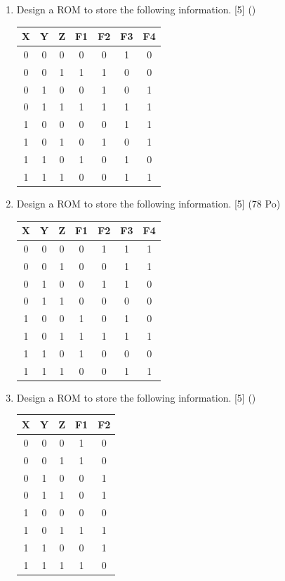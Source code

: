 \documentclass[12pt]{article}
\begin{document}
\begin{enumerate}
      \item Design a ROM to store the following information. \hfill [5] ()\\
      \begin{tabular}{|c|c|c||c|c|c|c|}
        \hline
        X & Y & Z & F1 & F2 & F3 & F4 \\ \hline
        0 & 0 & 0 & 0 & 0 & 1 & 0 \\ \hline
        0 & 0 & 1 & 1 & 1 & 0 & 0 \\ \hline
        0 & 1 & 0 & 0 & 1 & 0 & 1 \\ \hline
        0 & 1 & 1 & 1 & 1 & 1 & 1 \\ \hline
        1 & 0 & 0 & 0 & 0 & 1 & 1 \\ \hline
        1 & 0 & 1 & 0 & 1 & 0 & 1 \\ \hline
        1 & 1 & 0 & 1 & 0 & 1 & 0 \\ \hline
        1 & 1 & 1 & 0 & 0 & 1 & 1 \\ \hline
      \end{tabular}

      \item Design a ROM to store the following information. \hfill [5] (78 Po)\\
      \begin{tabular}{|c|c|c||c|c|c|c|}
        \hline
        X & Y & Z & F1 & F2 & F3 & F4 \\ \hline
        0 & 0 & 0 & 0 & 1 & 1 & 1 \\ \hline
        0 & 0 & 1 & 0 & 0 & 1 & 1 \\ \hline
        0 & 1 & 0 & 0 & 1 & 1 & 0 \\ \hline
        0 & 1 & 1 & 0 & 0 & 0 & 0 \\ \hline
        1 & 0 & 0 & 1 & 0 & 1 & 0 \\ \hline
        1 & 0 & 1 & 1 & 1 & 1 & 1 \\ \hline
        1 & 1 & 0 & 1 & 0 & 0 & 0 \\ \hline
        1 & 1 & 1 & 0 & 0 & 1 & 1 \\ \hline
      \end{tabular}

      \item Design a ROM to store the following information. \hfill [5] ()\\
      \begin{tabular}{|c|c|c||c|c|}
        \hline
        X & Y & Z & F1 & F2 \\ \hline
        0 & 0 & 0 & 1 & 0 \\ \hline
        0 & 0 & 1 & 1 & 0 \\ \hline
        0 & 1 & 0 & 0 & 1 \\ \hline
        0 & 1 & 1 & 0 & 1 \\ \hline
        1 & 0 & 0 & 0 & 0 \\ \hline
        1 & 0 & 1 & 1 & 1 \\ \hline
        1 & 1 & 0 & 0 & 1 \\ \hline
        1 & 1 & 1 & 1 & 0 \\ \hline
      \end{tabular}
    \end{enumerate}
\end{document}
